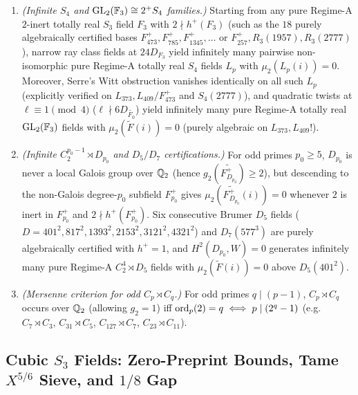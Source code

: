 \begin{theorem}\label{thm:4:inf-solv}
\tagProved{}
\begin{enumerate}[label=\textup{(\roman*)}]
\item \emph{(Infinite $S_4$ and $\mathrm{GL}_2(\mathbb{F}_3) \cong 2^+ S_4$ families.)} Starting from any pure Regime-A $2$-inert totally real $S_3$ field $F_3$ with $2 \nmid h^+(F_3)$ (such as the $18$ purely algebraically certified bases $F^+_{473}, F^+_{785}, F^+_{1345}, \dots$ or $F^+_{257}, R_3(1957), R_3(2777)$), narrow ray class fields at $24 D_{F_3}$ yield infinitely many pairwise non-isomorphic pure Regime-A totally real $S_4$ fields $L_p$ with $\mu_2(L_p(i)) = 0$. Moreover, Serre's Witt obstruction vanishes identically on all such $L_p$ (explicitly verified on $L_{373}, L_{409}/F^+_{473}$ and $S_4(2777)$), and quadratic twists at $\ell \equiv 1 \pmod 4$ ($\ell \nmid 6 D_{\widetilde{F_0}}$) yield infinitely many pure Regime-A totally real $\mathrm{GL}_2(\mathbb{F}_3)$ fields with $\mu_2(\widetilde{F}(i)) = 0$ (purely algebraic on $L_{373}, L_{409}$!).
\item \emph{(Infinite $C_2^{p_0-1} \rtimes D_{p_0}$ and $D_5/D_7$ certifications.)} For odd primes $p_0 \ge 5$, $D_{p_0}$ is never a local Galois group over $\mathbb{Q}_2$ (hence $g_2(\widetilde{F^+_{D_{p_0}}}) \ge 2$), but descending to the non-Galois degree-$p_0$ subfield $F_{p_0}^+$ gives $\mu_2(\widetilde{F_{D_{p_0}}^+}(i)) = 0$ whenever $2$ is inert in $F_{p_0}^+$ and $2 \nmid h^+(F_{p_0}^+)$. Six consecutive Brumer $D_5$ fields ($D = 401^2, 817^2, 1393^2, 2153^2, 3121^2, 4321^2$) and $D_7(577^3)$ are purely algebraically certified with $h^+ = 1$, and $H^2(D_{p_0}, W) = 0$ generates infinitely many pure Regime-A $C_2^4 \rtimes D_5$ fields with $\mu_2(\widetilde{F}(i)) = 0$ above $D_5(401^2)$.
\item \emph{(Mersenne criterion for odd $C_p \rtimes C_q$.)} For odd primes $q \mid (p-1)$, $C_p \rtimes C_q$ occurs over $\mathbb{Q}_2$ (allowing $g_2 = 1$) iff $\operatorname{ord}_p(2) = q \iff p \mid (2^q - 1)$ (e.g.\ $C_7 \rtimes C_3$, $C_{31}\rtimes C_5$, $C_{127}\rtimes C_7$, $C_{23}\rtimes C_{11}$).
\end{enumerate}
\end{theorem}

\subsection{Cubic $S_3$ Fields: Zero-Preprint Bounds, Tame $X^{5/6}$ Sieve, and $1/8$ Gap}\label{sec:4:s3}

